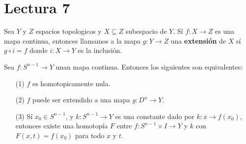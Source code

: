 \section*{Lectura 7}

\begin{definition}
    Sea $Y$ y  $Z$ espacios topologicos y $X \subseteq Z$ subespacio de $Y$.
    S\'i $f:X \xrightarrow{} Z$ es una mapa continua, entonces llamamos a la
    mapa $g:Y \xrightarrow{} Z$ una \textbf{extensi\'on} de $X$ s\'i  $g \circ
    i=f$ donde  $i:X \xrightarrow{} Y$ es la inclusi\'on.
\end{definition}

\begin{theorem}\label{thm_6.12}
    Sea $f:S^{n-1} \xrightarrow{} Y$ unan mapa continua. Entonces los siguientes
    son equivalentes:
    \begin{enumerate}
        \item[(1)] $f$ es homotopicamente nula.

        \item[(2)] $f$ puede ser extendido a una mapa  $g:D^{n} \xrightarrow{}
            Y$.

        \item[(3)] S\'i $x_0 \in S^{n-1}$, y $k:S^{n-1} \xrightarrow{} Y$ es una
            constante dado por $k:x \xrightarrow{} f(x_0)$, entonces existe una
            homotop\'ia $F$ entre  $f:S^{n-1} \times I \xrightarrow{} Y$ y $k$
            con  $F(x,t)=f(x_0)$ para todo $x$ y  $t$.
    \end{enumerate}
\end{theorem}
